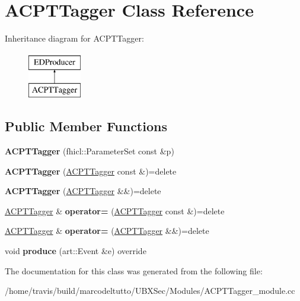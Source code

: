 \hypertarget{classACPTTagger}{\section{A\-C\-P\-T\-Tagger Class Reference}
\label{classACPTTagger}
}
Inheritance diagram for A\-C\-P\-T\-Tagger\-:\begin{figure}[H]
\begin{center}
\leavevmode
\includegraphics[height=2.000000cm]{classACPTTagger}
\end{center}
\end{figure}
\subsection*{Public Member Functions}
\begin{DoxyCompactItemize}
\item 
\hypertarget{classACPTTagger_a40826f58d28a7a25c0eeab2db30fa348}{{\bfseries A\-C\-P\-T\-Tagger} (fhicl\-::\-Parameter\-Set const \&p)}\label{classACPTTagger_a40826f58d28a7a25c0eeab2db30fa348}

\item 
\hypertarget{classACPTTagger_a97c00ff11dd51943192529d7532344f3}{{\bfseries A\-C\-P\-T\-Tagger} (\hyperlink{classACPTTagger}{A\-C\-P\-T\-Tagger} const \&)=delete}\label{classACPTTagger_a97c00ff11dd51943192529d7532344f3}

\item 
\hypertarget{classACPTTagger_acedfdf5c74d9ac721b5eb04420763c4f}{{\bfseries A\-C\-P\-T\-Tagger} (\hyperlink{classACPTTagger}{A\-C\-P\-T\-Tagger} \&\&)=delete}\label{classACPTTagger_acedfdf5c74d9ac721b5eb04420763c4f}

\item 
\hypertarget{classACPTTagger_afd87968bb97f886f421f588053423c63}{\hyperlink{classACPTTagger}{A\-C\-P\-T\-Tagger} \& {\bfseries operator=} (\hyperlink{classACPTTagger}{A\-C\-P\-T\-Tagger} const \&)=delete}\label{classACPTTagger_afd87968bb97f886f421f588053423c63}

\item 
\hypertarget{classACPTTagger_a4214057b2ad88e7e92393c5c005be228}{\hyperlink{classACPTTagger}{A\-C\-P\-T\-Tagger} \& {\bfseries operator=} (\hyperlink{classACPTTagger}{A\-C\-P\-T\-Tagger} \&\&)=delete}\label{classACPTTagger_a4214057b2ad88e7e92393c5c005be228}

\item 
\hypertarget{classACPTTagger_a263217e3f0e822270756d498623788fb}{void {\bfseries produce} (art\-::\-Event \&e) override}\label{classACPTTagger_a263217e3f0e822270756d498623788fb}

\end{DoxyCompactItemize}


The documentation for this class was generated from the following file\-:\begin{DoxyCompactItemize}
\item 
/home/travis/build/marcodeltutto/\-U\-B\-X\-Sec/\-Modules/A\-C\-P\-T\-Tagger\-\_\-module.\-cc\end{DoxyCompactItemize}
